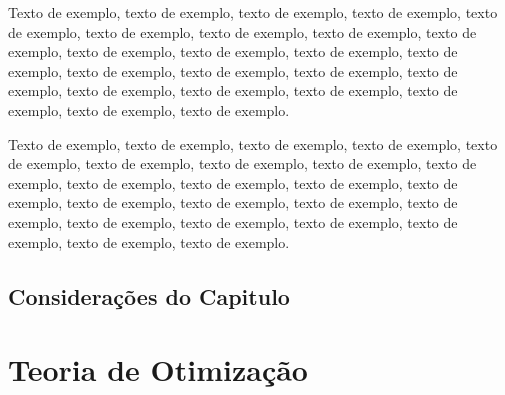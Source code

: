 \documentclass[
	12pt,				%
	oneside,			%
	a4paper,			%
	english,			%
	brazil				%
	]{abntex2ppgsi}
\begin{document}
Texto de exemplo, texto de exemplo, texto de exemplo, texto de exemplo, texto de exemplo, texto de exemplo, texto de exemplo, texto de exemplo, texto de exemplo, texto de exemplo, texto de exemplo, texto de exemplo, texto de exemplo, texto de exemplo, texto de exemplo, texto de exemplo, texto de exemplo, texto de exemplo, texto de exemplo, texto de exemplo, texto de exemplo, texto de exemplo, texto de exemplo.

Texto de exemplo, texto de exemplo, texto de exemplo, texto de exemplo, texto de exemplo, texto de exemplo, texto de exemplo, texto de exemplo, texto de exemplo, texto de exemplo, texto de exemplo, texto de exemplo, texto de exemplo, texto de exemplo, texto de exemplo, texto de exemplo, texto de exemplo, texto de exemplo, texto de exemplo, texto de exemplo, texto de exemplo, texto de exemplo, texto de exemplo.

\section{Considerações do Capitulo}

\chapter{Teoria de Otimização}
\end{document}
